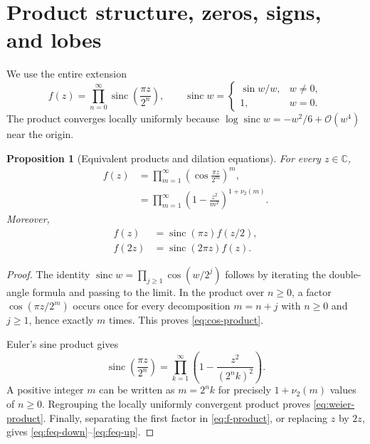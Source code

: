 \documentclass[11pt,oneside]{article}
\newtheorem{proposition}[theorem]{Proposition}
\theoremstyle{definition}
\theoremstyle{remark}
\newcommand{\C}{\mathbb C}
\newcommand{\sinc}{\operatorname{sinc}}
\newcommand{\bigO}{\mathcal O}
\newcommand{\vtwo}{\nu_2}
\begin{document}
\section{Product structure, zeros, signs, and lobes}

We use the entire extension
\begin{equation}
 f(z)=\prod_{n=0}^{\infty}\sinc\!\left(\frac{\pi z}{2^n}\right),
 \qquad \sinc w=\begin{cases}\sin w/w,&w\ne0,\\1,&w=0.\end{cases}
 \label{eq:f-product}
\end{equation}
The product converges locally uniformly because
$\log\sinc w=-w^2/6+\bigO(w^4)$ near the origin.

\begin{proposition}[Equivalent products and dilation equations]
For every $z\in\C$,
\begin{align}
 f(z)
 &=\prod_{m=1}^{\infty}
   \left(\cos\frac{\pi z}{2^m}\right)^m,                    \label{eq:cos-product}\\
 &=\prod_{m=1}^{\infty}
   \left(1-\frac{z^2}{m^2}\right)^{1+\vtwo(m)}.             \label{eq:weier-product}
\end{align}
Moreover,
\begin{align}
 f(z)&=\sinc(\pi z)f(z/2),                                  \label{eq:feq-down}\\
 f(2z)&=\sinc(2\pi z)f(z).                                  \label{eq:feq-up}
\end{align}
\end{proposition}

\begin{proof}
The identity $\sinc w=\prod_{j\ge1}\cos(w/2^j)$ follows by iterating the
double-angle formula and passing to the limit.  In the product over $n\ge0$,
a factor $\cos(\pi z/2^m)$ occurs once for every decomposition $m=n+j$ with
$n\ge0$ and $j\ge1$, hence exactly $m$ times.  This proves
\eqref{eq:cos-product}.

Euler's sine product gives
\[
 \sinc\!\left(\frac{\pi z}{2^n}\right)
 =\prod_{k=1}^{\infty}\left(1-\frac{z^2}{(2^nk)^2}\right).
\]
A positive integer $m$ can be written as $m=2^nk$ for precisely
$1+\vtwo(m)$ values of $n\ge0$.  Regrouping the locally uniformly convergent
product proves \eqref{eq:weier-product}.  Finally, separating the first factor
in \eqref{eq:f-product}, or replacing $z$ by $2z$, gives
\eqref{eq:feq-down}--\eqref{eq:feq-up}.
\end{proof}
\end{document}
